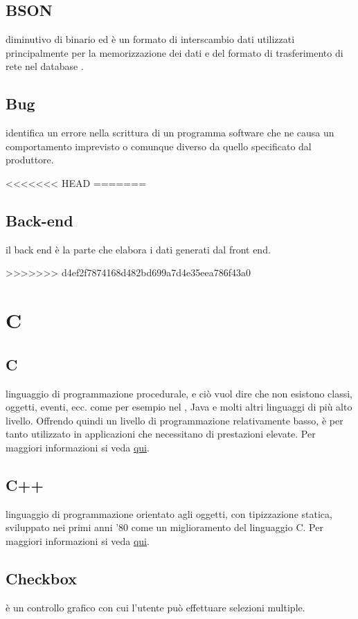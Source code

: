 \documentclass[12pt,a4paper]{article}
\begin{document}
\subsection{BSON}
 diminutivo di  binario ed è un formato di interscambio dati utilizzati principalmente per la memorizzazione dei dati e del formato di trasferimento di rete nel database .

\subsection{Bug}
 identifica un errore nella scrittura di un programma software che ne causa un comportamento imprevisto o comunque diverso da quello specificato dal produttore.

<<<<<<< HEAD
=======
\subsection{Back-end}
il back end è la parte che elabora i dati generati dal front end.


>>>>>>> d4ef2f7874168d482bd699a7d4e35eea786f43a0
\newpage

\section{C}

\subsection{C}
 linguaggio di programmazione procedurale, e ciò vuol dire che non esistono classi, oggetti, eventi, ecc. come per esempio nel , Java e molti altri linguaggi di più alto livello. Offrendo quindi un livello di programmazione relativamente basso, è per tanto utilizzato in applicazioni che necessitano di prestazioni elevate. Per maggiori informazioni si veda \href{https://it.wikiversity.org/wiki/Linguaggio_C}{qui}.

\subsection{C++}
 linguaggio di programmazione orientato agli oggetti, con tipizzazione statica, sviluppato nei primi anni '80 come un miglioramento del linguaggio C. Per maggiori informazioni si veda \href{https://it.wikiversity.org/wiki/C\%2B\%2B}{qui}.

\subsection{Checkbox}
 è un controllo grafico con cui l'utente può effettuare selezioni multiple.
\end{document}
